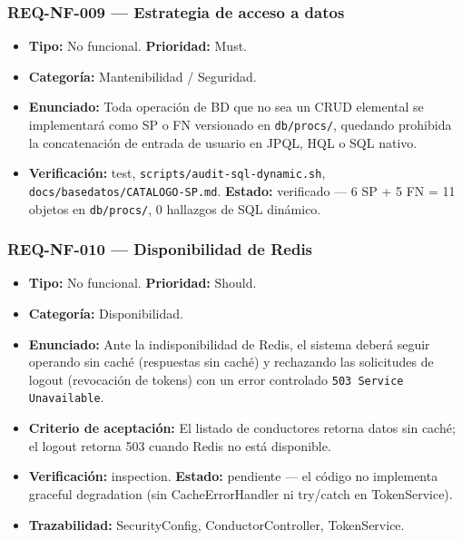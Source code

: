\documentclass[12pt,a4paper]{article}
\begin{document}
\subsubsection{REQ-NF-009 --- Estrategia de acceso a datos}
\begin{itemize}
  \item \textbf{Tipo:} No funcional. \textbf{Prioridad:} Must.
  \item \textbf{Categoría:} Mantenibilidad / Seguridad.
  \item \textbf{Enunciado:} Toda operación de BD que no sea un CRUD elemental se implementará como SP o FN versionado en \texttt{db/procs/}, quedando prohibida la concatenación de entrada de usuario en JPQL, HQL o SQL nativo.
  \item \textbf{Verificación:} test, \texttt{scripts/audit-sql-dynamic.sh}, \texttt{docs/basedatos/CATALOGO-SP.md}. \textbf{Estado:} verificado --- 6 SP + 5 FN = 11 objetos en \texttt{db/procs/}, 0 hallazgos de SQL dinámico.
\end{itemize}

\subsubsection{REQ-NF-010 --- Disponibilidad de Redis}
\begin{itemize}
  \item \textbf{Tipo:} No funcional. \textbf{Prioridad:} Should.
  \item \textbf{Categoría:} Disponibilidad.
  \item \textbf{Enunciado:} Ante la indisponibilidad de Redis, el sistema deberá seguir operando sin caché (respuestas sin caché) y rechazando las solicitudes de logout (revocación de tokens) con un error controlado \texttt{503 Service Unavailable}.
  \item \textbf{Criterio de aceptación:} El listado de conductores retorna datos sin caché; el logout retorna 503 cuando Redis no está disponible.
  \item \textbf{Verificación:} inspection. \textbf{Estado:} pendiente --- el código no implementa graceful degradation (sin CacheErrorHandler ni try/catch en TokenService).
  \item \textbf{Trazabilidad:} SecurityConfig, ConductorController, TokenService.
\end{itemize}
\end{document}
